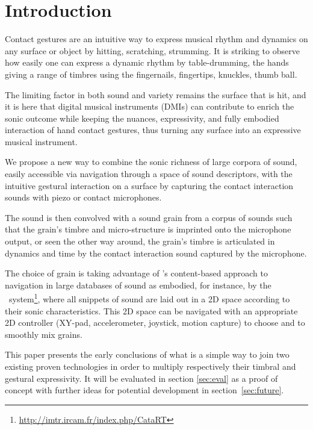 \section{Introduction}


Contact gestures are an intuitive way to express musical rhythm and dynamics on any surface or object by hitting, scratching, strumming.  It is striking to observe how easily one can express a dynamic rhythm by table-drumming, the hands giving a range of timbres using the fingernails, fingertips, knuckles, thumb ball.


The limiting factor in both sound and variety remains the surface that is hit, and it is here that digital musical instruments (DMIs) can contribute to enrich the sonic outcome while keeping the nuances, expressivity, and fully embodied interaction of hand contact gestures, thus turning any surface into an expressive musical instrument.


We propose a new way to combine the sonic richness of large corpora of sound, easily accessible via navigation through a space of sound descriptors, with the intuitive gestural interaction on a surface by capturing the contact interaction sounds with piezo or contact microphones.

The sound is then convolved with a sound grain from a corpus of sounds such that the grain's timbre and micro-structure is imprinted onto the microphone output, or seen the other way around, the grain's timbre is articulated in dynamics and time by the contact interaction sound captured by the microphone. 

The choice of grain is taking advantage of \cbcs's content-based approach to navigation in large databases of sound as embodied, for instance, by the \catart\ system\footnote{\url{http://imtr.ircam.fr/index.php/CataRT}}, where all snippets of sound are laid out in a 2D space according to their sonic characteristics.  This 2D space can be navigated with an appropriate 2D controller (XY-pad, accelerometer, joystick, motion capture) to choose and to smoothly mix grains.

This paper presents the early conclusions of what is a simple way to join two existing proven technologies in order to multiply respectively their timbral and gestural expressivity. It will be evaluated in section \ref{sec:eval} as a proof of concept with further ideas for potential development in section~\ref{sec:future}.


